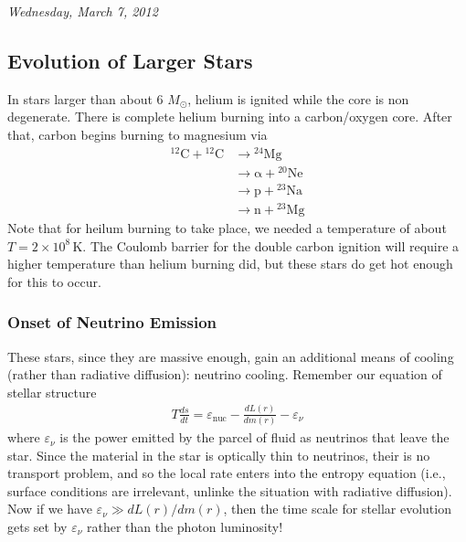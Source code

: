 \documentclass[10pt]{article}
\numberwithin{equation}{section}
\newcommand{\n}{\noindent}
\begin{document}
    \n \textit{Wednesday, March 7, 2012}
    \subsection{Evolution of Larger Stars}
    \label{sec:evolution-gt-6}
    In stars larger than about 6 $M_\odot$, helium is ignited while
    the core is non degenerate. There is complete helium burning into
    a carbon/oxygen core. After that, carbon begins burning to
    magnesium via
    \begin{align}
      \label{eq:336}
      \mathrm{{}^{12}C+{}^{12}C}&\to \mathrm{{}^{24}Mg}\\
      &\to \mathrm{\alpha+{}^{20}Ne}\\
      &\to \mathrm{p+{}^{23}Na}\\
      &\to \mathrm{n+{}^{23}Mg}
    \end{align}
    Note that for heilum burning to take place, we needed a
    temperature of about $T=2\times 10^8\,\mathrm{K}$. The Coulomb
    barrier for the double carbon ignition will require a higher
    temperature than helium burning did, but these stars do get hot
    enough for this to occur. 

    \subsubsection{Onset of Neutrino Emission}
    \label{sec:onset-neutr-emiss}

    These stars, since they are massive enough, gain an additional
    means of cooling (rather than radiative diffusion): neutrino
    cooling. Remember our equation of stellar structure
    \begin{align}
      \label{eq:337}
      T\frac{ds}{dt}=\varepsilon_{\mathrm{nuc}}-\frac{dL(r)}{dm(r)}-
\varepsilon_\nu
    \end{align}
    where $\varepsilon_\nu$ is the power emitted by the parcel of
    fluid as neutrinos that leave the star. Since the material in the
    star is optically thin to neutrinos, their is no transport
    problem, and so the local rate enters into the entropy equation
    (i.e., surface conditions are irrelevant, unlinke the situation
    with radiative diffusion).\\

    \n Now if we have $\varepsilon_\nu\gg dL(r)/dm(r)$, then the time
    scale for stellar evolution gets set by $\varepsilon_\nu$ rather
    than the photon luminosity!\\
\end{document}
